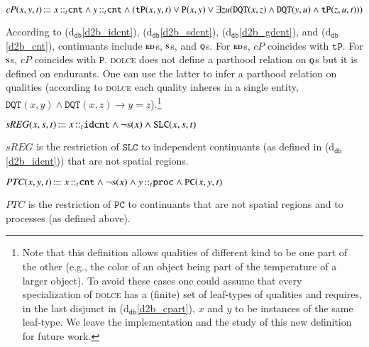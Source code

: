 \documentclass[ao]{iosart2x}
\newcommand{\dbDefLabel}{\textrm{d$_\texttt{db}$}}
\newcounter{cntdbdf}
\newcommand{\dbdf}[1]{\refstepcounter{cntdbdf}\begin{small}{\bf \dbDefLabel\thecntdbdf\label{#1}}\end{small}}
\newcommand{\refdbdf}[1]{({\dbDefLabel}\ref{#1})}
\newcommand{\pr}[1]{\mathtt{#1}}
\newcommand{\prbfo}[1]{{\textit{{#1}}}}
\newcommand{\cn}[1]{\mathtt{#1}}
\newcommand\textequal{%
 \rule[.08ex]{5pt}{0.35pt}\llap{\rule[.78ex]{5pt}{0.35pt}}}
\newcommand{\sdef}{{\hspace{1.5pt}:\hspace{-2.5pt}\textequal\hspace{3pt}}}
\newcommand{\dolce}{{\textsc{dolce}}}
\newcommand{\bfo}{{\textsc{bfo}}}
\newcommand {\EDdcat} {\textsc{ed}}
\newcommand {\Qdcat} {\textsc{q}}
\newcommand {\Sdcat} {\textsc{s}}
\newcommand {\TPd} {\ensuremath{\pr{tP}}}
\newcommand {\Pd} {\ensuremath{\pr{P}}}
\newcommand {\DQTd} {\ensuremath{\pr{DQT}}}
\newcommand {\PCd} {\ensuremath{\pr{PC}}}
\newcommand {\SLCd} {\ensuremath{\pr{SLC}}}
\newcommand{\cntbcat}{\cn{cnt}}
\newcommand{\idcntbcat}{\cn{idcnt}}
\newcommand{\procbcat}{\cn{proc}}
\newcommand{\bfocpart}{\prbfo{cP}}
\newcommand{\bfoiof}[1]{{\,::_{#1\:\!}}}
\newcommand{\bfosregof}{\prbfo{sREG}}
\newcommand{\bfoparticin}{\prbfo{PTC}}
\begin{document}
\item[\dbdf{d2b_cpart}] $\bfocpart(x,y,t) \sdef x \bfoiof{t} \cntbcat \land y \bfoiof{t} \cntbcat \land (\TPd(x,y,t) \lor \Pd(x,y) \lor \exists zu(\DQTd(x,z) \land \DQTd(y,u) \land \TPd(z,u,t)))$

\vspace{1pt}
According to \refdbdf{d2b_idcnt}, \refdbdf{d2b_sdcnt}, \refdbdf{d2b_gdcnt}, and \refdbdf{d2b_cnt}, continuants include $\EDdcat$s, $\Sdcat$s, and $\Qdcat$s. For $\EDdcat$s, $\bfocpart$ coincides with $\TPd$. For $\Sdcat$s, $\bfocpart$ coincides with $\Pd$. {\dolce} does not define a parthood relation on $\Qdcat$s but it is defined on endurants. One can use the latter to infer a parthood relation on qualities (according to {\dolce} each quality inheres in a single entity,  $\DQTd(x,y) \land \DQTd(x,z) \to y=z$).\footnote{Note that this definition allows qualities of different kind to be one part of the other (e.g., the color of an object being part of the temperature of a larger object). To avoid these cases one could assume that every specialization of {\dolce} has a (finite) set of leaf-types of qualities and requires, in the last disjunct in \refdbdf{d2b_cpart}, $x$ and $y$ to be instances of the same leaf-type. We leave the  implementation and the study of this new definition for future work.}


\item[\dbdf{d2b_sregof}] $\bfosregof(x,s,t) \sdef x \bfoiof{t} \idcntbcat \land \neg\Sdcat(x) \land \SLCd(x,s,t)$

\vspace{1pt}
$\bfosregof$ is the restriction of $\SLCd$ to independent continuants (as defined in \refdbdf{d2b_idcnt}) that are not spatial regions.  

\item[\dbdf{d2b_partic}] $\bfoparticin(x,y,t) \sdef x \bfoiof{t} \cntbcat \land \neg\Sdcat(x) \land y \bfoiof{t} \procbcat \land \PCd(x,y,t)$

\vspace{1pt}
$\bfoparticin$ is the restriction of $\PCd$ to continuants that are not spatial regions and to processes (as defined above).  
\end{document}
